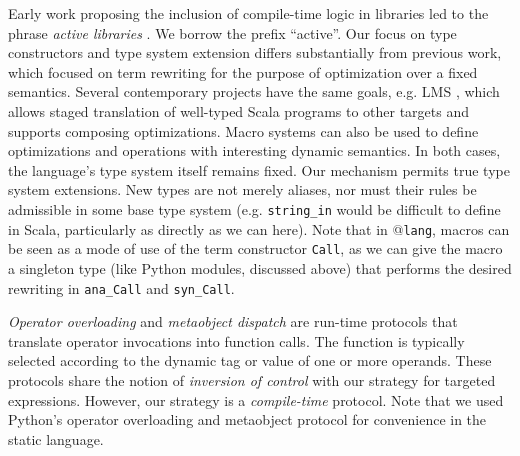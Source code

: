 \documentclass[9pt]{sigplanconf}
\newcommand{\lstinlinep}[1]{\lstinline[language=Python,basicstyle=\ttfamily\small,deletendkeywords={tuple,buffer,map}]{#1}}
\begin{document}

Early work proposing the inclusion of compile-time logic in libraries led to the phrase {\it active libraries} \cite{activelibraries}. We borrow the prefix ``active''. Our focus on type constructors and type system extension differs substantially from previous work, which focused on term rewriting for the purpose of optimization over a fixed semantics. Several contemporary projects have the same goals, e.g. LMS \cite{Rompf:2012:LMS}, which allows staged translation of well-typed Scala programs to other targets and supports composing optimizations. Macro systems can also be used to define optimizations and operations with interesting dynamic semantics. In both cases, the language's type system itself remains fixed. Our mechanism permits true type system extensions. New types are not merely aliases, nor must their rules be admissible in some base type system (e.g. \lstinlinep{string_in} would be difficult to define in Scala, particularly as directly as we can here). Note that in @\texttt{lang}, macros can be seen as a mode of use of the term constructor \verb|Call|, as we can give the macro a singleton type (like Python modules, discussed above) that performs the desired rewriting in \verb|ana_Call| and \verb|syn_Call|.


{\it Operator overloading} \cite{vanWijngaarden:Mailloux:Peck:Koster:Sintzoff:Lindsey:Meertens:Fisker:acta:1975} and {\it metaobject dispatch} \cite{Kiczales91} are run-time protocols that translate operator invocations into function calls. The function is typically selected according to the dynamic tag or value of one or more operands. These protocols share the notion of {\it inversion of control} with our strategy for targeted expressions. However, our strategy is a {\it compile-time} protocol. Note that we used Python's operator overloading and metaobject protocol for convenience in the static language. %
\end{document}
